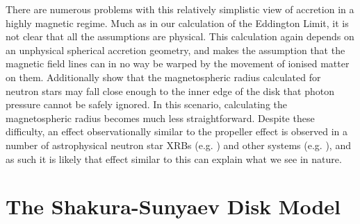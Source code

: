 \par There are numerous problems with this relatively simplistic view of accretion in a highly magnetic regime.  Much as in our calculation of the Eddington Limit, it is not clear that all the assumptions are physical.  This calculation again depends on an unphysical spherical accretion geometry, and makes the assumption that the magnetic field lines can in no way be warped by the movement of ionised matter on them.  Additionally \citet{White_MRad} show that the magnetospheric radius calculated for neutron stars may fall close enough to the inner edge of the disk that photon pressure cannot be safely ignored.  In this scenario, calculating the magnetospheric radius becomes much less straightforward.  Despite these difficulty, an effect observationally similar to the propeller effect is observed in a number of astrophysical neutron star XRBs (e.g. \citealp{Fabian_Propex,Furst_Propex}) and other systems (e.g. \citep{Campana_PropBorder}), and as such it is likely that effect similar to this can explain what we see in nature.

\section{The Shakura-Sunyaev Disk Model}

